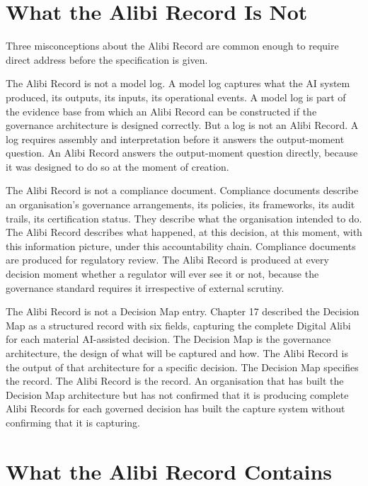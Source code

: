 \scenebreak

\section{What the Alibi Record Is Not}

Three misconceptions about the Alibi Record are common enough to require direct address before the specification is given.

The Alibi Record is not a model log. A model log captures what the AI system produced, its outputs, its inputs, its operational events. A model log is part of the evidence base from which an Alibi Record can be constructed if the governance architecture is designed correctly. But a log is not an Alibi Record. A log requires assembly and interpretation before it answers the output-moment question. An Alibi Record answers the output-moment question directly, because it was designed to do so at the moment of creation.

The Alibi Record is not a compliance document. Compliance documents describe an organisation's governance arrangements, its policies, its frameworks, its audit trails, its certification status. They describe what the organisation intended to do. The Alibi Record describes what happened, at this decision, at this moment, with this information picture, under this accountability chain. Compliance documents are produced for regulatory review. The Alibi Record is produced at every decision moment whether a regulator will ever see it or not, because the governance standard requires it irrespective of external scrutiny.

The Alibi Record is not a Decision Map entry. Chapter 17 described the Decision Map as a structured record with six fields, capturing the complete Digital Alibi for each material AI-assisted decision. The Decision Map is the governance architecture, the design of what will be captured and how. The Alibi Record is the output of that architecture for a specific decision. The Decision Map specifies the record. The Alibi Record is the record. An organisation that has built the Decision Map architecture but has not confirmed that it is producing complete Alibi Records for each governed decision has built the capture system without confirming that it is capturing.

\scenebreak

\section{What the Alibi Record Contains}

